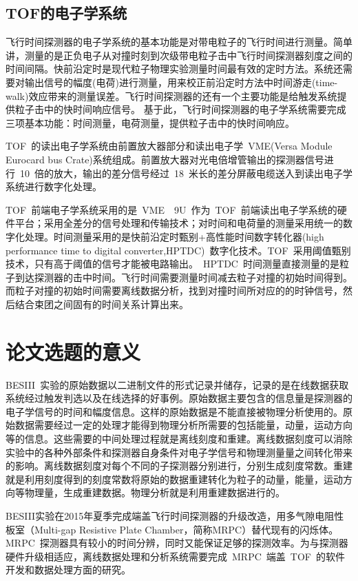 \subsection{TOF的电子学系统}
飞行时间探测器的电子学系统的基本功能是对带电粒子的飞行时间进行测量。简单讲，测量的是正负电子从对撞时刻到次级带电粒子击中飞行时间探测器刻度之间的时间间隔。快前沿定时是现代粒子物理实验测量时间最有效的定时方法。系统还需要对输出信号的幅度(电荷)进行测量，用来校正前沿定时方法中时间游走(time-walk)效应带来的测量误差。飞行时间探测器的还有一个主要功能是给触发系统提供粒子击中的快时间响应信号。
基于此，飞行时间探测器的电子学系统需要完成三项基本功能：时间测量，电荷测量，提供粒子击中的快时间响应。

TOF~的读出电子学系统由前置放大器部分和读出电子学~VME(Versa Module Eurocard bus Crate)系统组成。前置放大器对光电倍增管输出的探测器信号进行~10~倍的放大，输出的差分信号经过~18~米长的差分屏蔽电缆送入到读出电子学系统进行数字化处理。

TOF~前端电子学系统采用的是~VME$\quad$9U~作为~TOF~前端读出电子学系统的硬件平台；采用全差分的信号处理和传输技术；对时间和电荷量的测量采用统一的数字化处理。时间测量采用的是快前沿定时甄别+高性能时间数字转化器(high performance time to digital converter,HPTDC)~数字化技术。TOF~采用阈值甄别技术，只有高于阈值的信号才能被电路输出。~HPTDC~时间测量直接测量的是粒子到达探测器的击中时间。飞行时间需要测量时间减去粒子对撞的初始时间得到。而粒子对撞的初始时间需要离线数据分析，找到对撞时间所对应的的时钟信号，然后结合束团之间固有的时间关系计算出来。

\section{论文选题的意义}

BESIII~实验的原始数据以二进制文件的形式记录并储存，记录的是在线数据获取系统经过触发判选以及在线选择的好事例。原始数据主要包含的信息量是探测器的电子学信号的时间和幅度信息。这样的原始数据是不能直接被物理分析使用的。原始数据需要经过一定的处理才能得到物理分析所需要的包括能量，动量，运动方向等的信息。这些需要的中间处理过程就是离线刻度和重建。离线数据刻度可以消除实验中的各种外部条件和探测器自身条件对电子学信号和物理测量量之间转化带来的影响。离线数据刻度对每个不同的子探测器分别进行，分别生成刻度常数。重建就是利用刻度得到的刻度常数将原始的数据重建转化为粒子的动量，能量，运动方向等物理量，生成重建数据。物理分析就是利用重建数据进行的。\cite{wangyf2011}

BESIII实验在2015年夏季完成端盖飞行时间探测器的升级改造，用多气隙电阻性板室（Multi-gap Resistive Plate Chamber，简称MRPC）替代现有的闪烁体。MRPC~探测器具有较小的时间分辨，同时又能保证足够的探测效率。为与探测器硬件升级相适应，离线数据处理和分析系统需要完成~MRPC~端盖~TOF~的软件开发和数据处理方面的研究。

